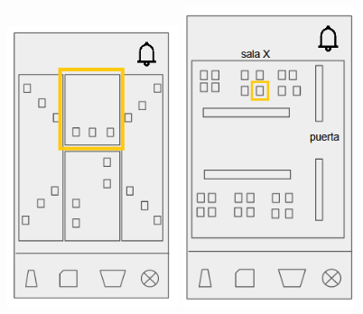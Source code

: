 \documentclass[12pt]{article}
\begin{document}
\begin{figure}
\medskip

	\includegraphics[width=0.45\textwidth]{mapa2.png} 
\endminipage
{}
	\includegraphics[width=0.45\textwidth]{mapa3.png} 
\endminipage

\medskip


\end{figure}
\end{document}
